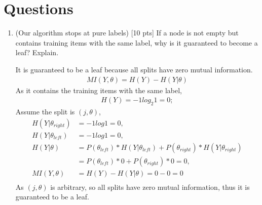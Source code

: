 \documentclass[a4paper]{article}
\theoremstyle{definition}
\begin{document}
\section{Questions}
\begin{enumerate}
\item (Our algorithm stops at pure labels) [10 pts] If a node is not empty but contains training items with the same label, why is it guaranteed to become a leaf?  Explain.
\\
\begin{itemize}
\color{blue}
It is guaranteed to be a leaf because all splits have zero mutual information. 
\begin{align}
    MI(Y, \theta) = H(Y) - H(Y|\theta)
\end{align}
As it contains the training items with the same label,
\begin{align}
    H(Y) = -1log_{2}1 = 0;
\end{align}
Assume the split is $(j,\theta)$, 
\begin{align}
    H(Y|\theta_{right})& = -1log1= 0,\\
    H(Y|\theta_{left}) &= -1log1= 0,\\
    H(Y|\theta) &= P(\theta_{left})*H(Y|\theta_{left}) + P(\theta_{right})*H(Y|\theta_{right})\\
    &= P(\theta_{left})*0 + P(\theta_{right})*0 = 0,\\
    MI(Y, \theta) &= H(Y) - H(Y|\theta)=0 - 0 = 0\\
\end{align}
As $(j,\theta)$ is arbitrary, so all splits have zero mutual information, thus it is guaranteed to be a leaf.

\end{itemize}





\end{enumerate}
\end{document}
